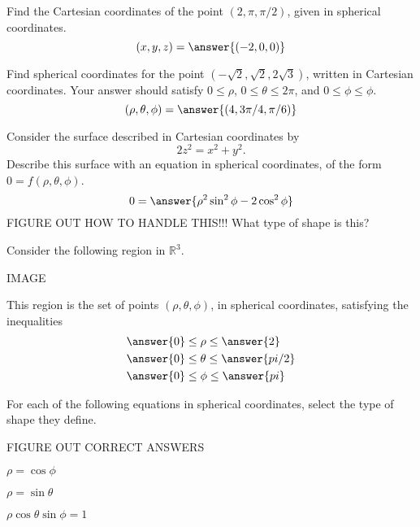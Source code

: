 \documentclass{ximera}
\begin{document}
\begin{problem}
Find the Cartesian coordinates of the point $(2, \pi, \pi/2)$, given in spherical coordinates.
\[
(x,y,z) = \answer{(-2,0,0)}
\]
\end{problem}

\begin{problem}
Find spherical coordinates for the point $\left(-\sqrt{2}, \sqrt{2}, 2\sqrt{3}\right)$, written in Cartesian coordinates. Your answer should satisfy $0\leq \rho$, $0\leq \theta \leq 2\pi$, and $0\leq \phi \leq \phi$.
\[
(\rho, \theta, \phi) = \answer{(4, 3\pi/4, \pi/6)}
\]
\end{problem}

\begin{problem}
Consider the surface described in Cartesian coordinates by
\[
2z^2 = x^2 +y^2.
\]
Describe this surface with an equation in spherical coordinates, of the form $0=f(\rho, \theta, \phi)$.
\[
0=\answer{\rho^2\sin^2\phi - 2\cos^2\phi}
\]
FIGURE OUT HOW TO HANDLE THIS!!!
What type of shape is this?
\begin{multipleChoice}
\end{multipleChoice}
\end{problem}

\begin{problem}
Consider the following region in $\mathbb{R}^3$.

IMAGE

This region is the set of points $(\rho,\theta,\phi)$, in spherical coordinates, satisfying the inequalities
\begin{align*}
&\answer{0}\leq\rho\leq \answer{2}\\
&\answer{0}\leq\theta\leq\answer{pi/2}\\
&\answer{0}\leq\phi\leq\answer{pi}
\end{align*}

\end{problem}

\begin{problem}
For each of the following equations in spherical coordinates, select the type of shape they define.

FIGURE OUT CORRECT ANSWERS

$\rho = \cos\phi$
\begin{multipleChoice}
\end{multipleChoice}

$\rho = \sin\theta$
\begin{multipleChoice}
\end{multipleChoice}

$\rho\cos\theta\sin\phi = 1$
\begin{multipleChoice}
\end{multipleChoice}
\end{problem}
\end{document}
